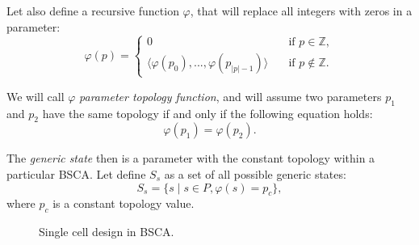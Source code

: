 \documentclass[a4paper,12pt,tikz,UTF8]{article}
\begin{document}
    Let also define a recursive function $\varphi$, that will replace all integers with zeros in a parameter:
    \begin{equation}
      \varphi(p) = 
      \begin{cases}
        0 \quad & \text{if } p \in \mathbb{Z},\\
        \langle \varphi(p_0), ..., \varphi(p_{|p|-1}) \rangle \quad & \text{if } p \notin \mathbb{Z}.
      \end{cases}
    \end{equation}

    We will call $\varphi$ \textit{parameter topology function}, and will assume two parameters $p_1$ and $p_2$ have the same topology if and only if the following equation holds:
    \begin{equation}
      \varphi(p_1) = \varphi(p_2).
    \end{equation}

    The \textit{generic state} then is a parameter with the constant topology within a particular BSCA. Let define $S_s$ as a set of all possible generic states:
    \begin{equation}
      S_s = \{ s \mid s \in P, \varphi(s) = p_c \},
    \end{equation}
    where $p_c$ is a constant topology value.

    \begin{figure}[h]
      \centering
      \caption{Single cell design in BSCA.}
      \label{fig:cell-design}
    \end{figure}
\end{document}
